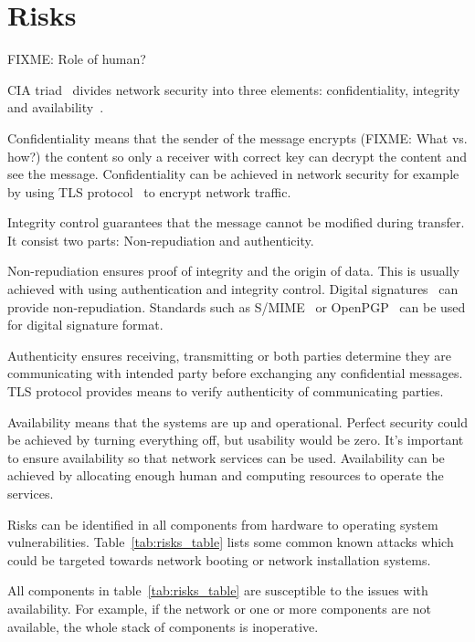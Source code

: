 \section{Risks}

FIXME: Role of human?

CIA triad~\cite{cia-triad} divides network security into three
elements: confidentiality, integrity and availability~\cite{anderson}.

Confidentiality means that the sender of the message encrypts (FIXME: What vs. how?) the
content so only a receiver with correct key can decrypt the content
and see the message. Confidentiality can be achieved in network
security for example by using TLS protocol~\cite{RFC5246} to encrypt
network traffic.

Integrity control guarantees that the message cannot be modified
during transfer. It consist two parts: Non-repudiation and
authenticity.

Non-repudiation ensures proof of integrity and the origin of
data. This is usually achieved with using authentication and integrity
control. Digital signatures~\cite{Diffie2006}\cite{Goldwasser1988} can
provide non-repudiation. Standards such as S/MIME~\cite{RFC5751} or
OpenPGP~\cite{RFC4880} can be used for digital signature format.

Authenticity ensures receiving, transmitting or both parties determine
they are communicating with intended party before exchanging any
confidential messages. TLS protocol provides means to verify
authenticity of communicating parties.

Availability means that the systems are up and operational. Perfect
security could be achieved by turning everything off, but usability
would be zero. It's important to ensure availability so that network
services can be used. Availability can be achieved by allocating
enough human and computing resources to operate the services.

Risks can be identified in all components from hardware to operating
system vulnerabilities. Table~\ref{tab:risks_table} lists some
common known attacks which could be targeted towards network booting
or network installation systems.

All components in table~\ref{tab:risks_table} are susceptible to the
issues with availability. For example, if the network or one or more
components are not available, the whole stack of components is
inoperative.

